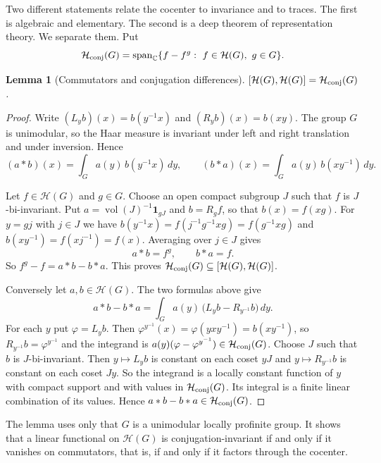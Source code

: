 \documentclass[12pt,letterpaper]{amsart}
\numberwithin{equation}{section}
\newtheorem{lemma}[theorem]{Lemma}
\theoremstyle{definition}
\theoremstyle{remark}
\newcommand{\calH}{\mathcal H}
\newcommand{\vol}{\operatorname{vol}}
\begin{document}
Two different statements relate the cocenter to invariance and to traces. The first is algebraic and elementary. The second is a deep theorem of representation theory. We separate them. Put
\[
\calH_{\rm conj}(G)=\operatorname{span}_{\mathbb C}\{f-f^g:\ f\in\calH(G),\ g\in G\}.
\]
\begin{lemma}[Commutators and conjugation differences]\label{lem:conj}
$[\calH(G),\calH(G)]=\calH_{\rm conj}(G)$.
\end{lemma}
\begin{proof}
Write $(L_yb)(x)=b(y^{-1}x)$ and $(R_yb)(x)=b(xy)$. The group $G$ is unimodular, so the Haar measure is invariant under left and right translation and under inversion. Hence
\[
(a*b)(x)=\int_Ga(y)\,b(y^{-1}x)\,dy,\qquad (b*a)(x)=\int_Ga(y)\,b(xy^{-1})\,dy .
\]

Let $f\in\calH(G)$ and $g\in G$. Choose an open compact subgroup $J$ such that $f$ is $J$-bi-invariant. Put $a=\vol(J)^{-1}\mathbf 1_{gJ}$ and $b=R_gf$, so that $b(x)=f(xg)$. For $y=gj$ with $j\in J$ we have $b(y^{-1}x)=f(j^{-1}g^{-1}xg)=f(g^{-1}xg)$ and $b(xy^{-1})=f(xj^{-1})=f(x)$. Averaging over $j\in J$ gives
\[
a*b=f^g,\qquad b*a=f .
\]
So $f^g-f=a*b-b*a$. This proves $\calH_{\rm conj}(G)\subseteq[\calH(G),\calH(G)]$.

Conversely let $a,b\in\calH(G)$. The two formulas above give
\[
a*b-b*a=\int_Ga(y)\,\bigl(L_yb-R_{y^{-1}}b\bigr)\,dy .
\]
For each $y$ put $\varphi=L_yb$. Then $\varphi^{y^{-1}}(x)=\varphi(yxy^{-1})=b(xy^{-1})$, so $R_{y^{-1}}b=\varphi^{y^{-1}}$ and the integrand is $a(y)(\varphi-\varphi^{y^{-1}})\in\calH_{\rm conj}(G)$. Choose $J$ such that $b$ is $J$-bi-invariant. Then $y\mapsto L_yb$ is constant on each coset $yJ$ and $y\mapsto R_{y^{-1}}b$ is constant on each coset $Jy$. So the integrand is a locally constant function of $y$ with compact support and with values in $\calH_{\rm conj}(G)$. Its integral is a finite linear combination of its values. Hence $a*b-b*a\in\calH_{\rm conj}(G)$.
\end{proof}
The lemma uses only that $G$ is a unimodular locally profinite group. It shows that a linear functional on $\calH(G)$ is conjugation-invariant if and only if it vanishes on commutators, that is, if and only if it factors through the cocenter.
\end{document}
